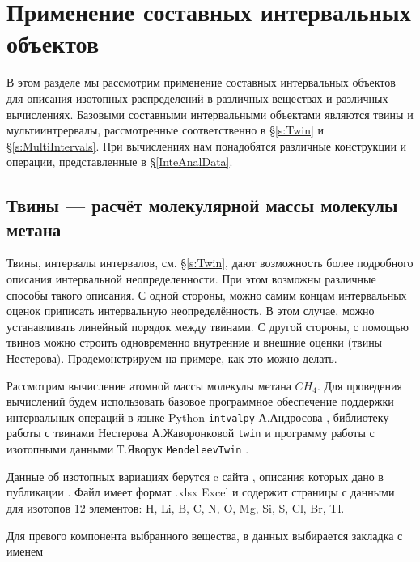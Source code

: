 \documentclass[a5paper,openany]{book}
\begin{document}
\section{Применение составных интервальных объектов}

В этом разделе мы рассмотрим применение составных интервальных объектов для описания изотопных распределений в различных веществах и различных вычислениях.
Базовыми составными интервальными объектами являются твины и мультиинтрервалы, рассмотренные соответственно в \S\ref{s:Twin} и \S\ref{s:MultiIntervals}.
При вычислениях нам понадобятся различные конструкции и операции, представленные  в \S\ref{InteAnalData}.

\subsection{Твины --- расчёт молекулярной массы молекулы метана}

Твины, интервалы интервалов, см. \S\ref{s:Twin}, дают возможность более подробного описания интервальной неопределенности. При этом возможны различные способы такого описания.
С одной стороны, можно самим концам интервальных оценок приписать интервальную неопределённость. В этом  случае, можно устанавливать линейный порядок между твинами. 
С другой стороны, с помощью твинов можно строить одновременно внутренние и внешние оценки (твины Нестерова). Продемонстрируем на примере, как это можно делать.

Рассмотрим вычисление атомной массы молекулы метана $CH_4$. Для проведения вычислений будем использовать базовое программное обеспечение поддержки интервальных операций в языке Python  {\tt intvalpy} А.Андросова \cite{intvalpy},
библиотеку работы с твинами Нестерова А.Жаворонковой {\tt twin} \cite{PythonTwin} и
программу работы с изотопными данными Т.Яворук {\tt MendeleevTwin} \cite{MendeleevTwin}.

Данные об изотопных вариациях берутся c сайта \cite{IsotopeData2018}, описания которых дано в публикации \cite{IUPACTables}.
Файл имеет формат .xlsx Excel и содержит страницы с данными для изотопов 12  элементов:
H, Li, B, C, N, O, Mg, Si, S, Cl, Br, Tl.

Для превого компонента выбранного вещества, в данных выбирается закладка с именем 
\end{document}
